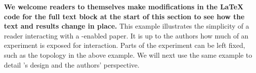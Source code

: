\vspace{0.05in}
\noindent \textbf{We welcome readers to themselves make modifications in the \LaTeX{} code for the full text block at the start of this section to see how the text and results change in place.} This example illustrates the simplicity of a reader interacting with a \sysname-enabled paper. It is up to the authors how much of an experiment is exposed for interaction. Parts of the experiment can be left fixed, such as the topology in the above example. We will next use the same example to detail \sysname's design and the authors' perspective.
